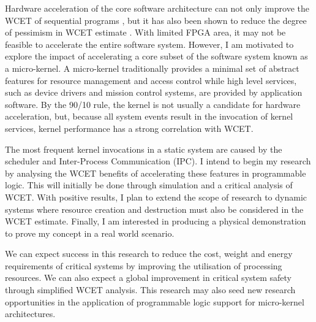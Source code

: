 Hardware acceleration of the core software architecture can not only improve the WCET of sequential
programs \cite{warp, micro_hyp}, but it has also 
been shown to reduce the degree of pessimism in WCET estimate \cite{aud_hardimp}.
With limited FPGA area, it may not be feasible to
accelerate the entire software system. However, I am motivated to explore the impact of accelerating a
core subset of the software system known as a micro-kernel. A micro-kernel traditionally provides a minimal
set of abstract features for resource management and access control while high level services, such as
device drivers and mission control systems, are provided by application software.
By the 90/10 rule, the kernel is not usually a candidate for hardware acceleration, but, because all
system events result in the invocation of kernel services, kernel performance has a strong correlation
with WCET.

The most frequent kernel invocations in a static system are caused by the scheduler and Inter-Process
Communication (IPC). I intend to begin my research by analysing the WCET benefits of accelerating these
features in programmable logic. This will initially be done through simulation and a critical analysis
of WCET. With positive results, I plan to extend the scope of research to dynamic systems where resource
creation and destruction must also be considered in the WCET estimate. Finally, I am interested in
producing a physical demonstration to prove my concept in a real world scenario.

We can expect success in this research to reduce the cost, weight and energy requirements of critical
systems by improving the utilisation of processing resources. We can also expect a global improvement
in critical system safety through simplified WCET analysis. This research may also seed new research
opportunities in the application of programmable logic support for micro-kernel architectures.



%



